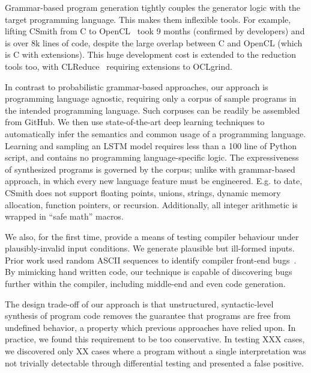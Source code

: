 Grammar-based program generation tightly couples the generator logic with the target programming language. This makes them inflexible tools. For example, lifting CSmith from C to OpenCL~\cite{Lidbury2015a} took 9 months (confirmed by developers) and is over 8k lines of code, despite the large overlap between C and OpenCL (which is C with extensions). This huge development cost is extended to the reduction tools too, with CLReduce~\cite{Pflanzer2016} requiring extensions to OCLgrind.


In contrast to probabilistic grammar-based approaches, our approach is programming language agnostic, requiring only a corpus of sample programs in the intended programming language. Such corpuses can be readily be assembled from GitHub. We then use state-of-the-art deep learning techniques to automatically infer the semantics and common usage of a programming language. Learning and sampling an LSTM model requires less than a 100 line of Python script, and contains no programming language-specific logic. The expressiveness of synthesized programs is governed by the corpus; unlike with grammar-based approach, in which every new language feature must be engineered. E.g. to date, CSmith does not support floating points, unions, strings, dynamic memory allocation, function pointers, or recursion. Additionally, all integer arithmetic is wrapped in ``safe math'' macros.

We also, for the first time, provide a means of testing compiler behaviour under plausibly-invalid input conditions. We generate plausible but ill-formed inputs. Prior work used random ASCII sequences to identify compiler front-end bugs~\cite{McKeeman1998}. By mimicking hand written code, our technique is capable of discovering bugs further within the compiler, including middle-end and even code generation.

The design trade-off of our approach is that unstructured, syntactic-level synthesis of program code removes the guarantee that programs are free from undefined behavior, a property which previous approaches have relied upon. In practice, we found this requirement to be too conservative. In testing XXX cases, we discovered only XX cases where a program without a single interpretation was not trivially detectable through differential testing and presented a false positive.

